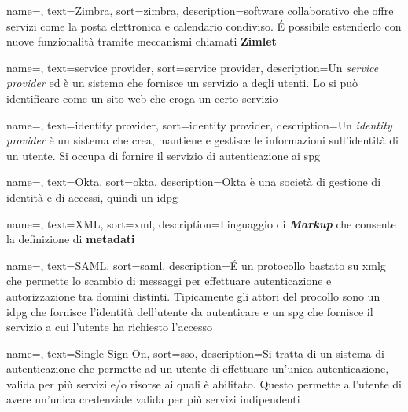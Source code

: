 
{
    name=,
    text=Zimbra,
    sort=zimbra,
    description={software collaborativo che offre servizi come la posta elettronica e calendario condiviso. \'E possibile estenderlo con nuove funzionalità tramite meccanismi chiamati \textbf{Zimlet}}
}

{
    name=,
    text=service provider,
    sort=service provider,
    description={Un \textit{service provider} ed è un sistema che fornisce un servizio a degli utenti. Lo si può identificare come un sito web che eroga un certo servizio}
}

{
    name=,
    text=identity provider,
    sort=identity provider,
    description={Un \textit{identity provider} è un sistema che crea, mantiene e gestisce le informazioni sull'identità di un utente. Si occupa di fornire il servizio di autenticazione ai \gls{spg}}
}

{
    name=,
    text=Okta,
    sort=okta,
    description={Okta è una società di gestione di identità e di accessi, quindi un \gls{idpg}}
}

{
    name=,
    text=XML,
    sort=xml,
    description={Linguaggio di \textit{\textbf{Markup}} che consente la definizione di \textbf{metadati}}
}

{
    name=,
    text=SAML,
    sort=saml,
    description={\'E un protocollo bastato su \gls{xmlg} che permette lo scambio di messaggi per effettuare autenticazione e autorizzazione tra domini distinti. Tipicamente gli attori del procollo sono un \gls{idpg} che fornisce l'identità dell'utente da autenticare e un \gls{spg} che fornisce il servizio a cui l'utente ha richiesto l'accesso}
}

{
    name=,
    text=Single Sign-On,
    sort=sso,
    description={Si tratta di un sistema di autenticazione che permette ad un utente di effettuare un'unica autenticazione, valida per più servizi e/o risorse ai quali è abilitato. Questo permette all'utente di avere un'unica credenziale valida per più servizi indipendenti}
}


